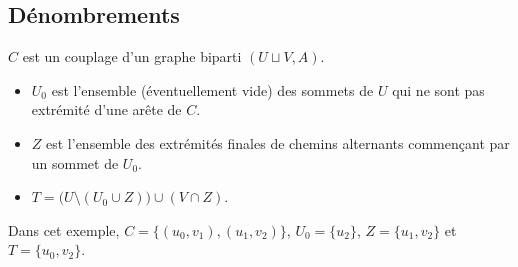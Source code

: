 \subsection{Dénombrements}

$C$ est un couplage d'un graphe biparti $(U\sqcup V, A)$.

\begin{itemize}
    \item $U_0$ est l'ensemble (éventuellement vide) des sommets de $U$ qui ne sont pas extrémité d'une arête de $C$.
    \item $Z$ est l'ensemble des extrémités finales de chemins alternants commençant par un sommet de $U_0$.
    \item $T= \bigl(U\setminus(U_0\cup Z)\bigr) \cup (V \cap Z)$.
\end{itemize}
\begin{center}
\end{center}

Dans cet exemple, $C = \{(u_0, v_1), (u_1, v_2)\}$, $U_0 = \{u_2\}$, $Z = \{u_1, v_2\}$ et $T=\{u_0, v_2\}$.

